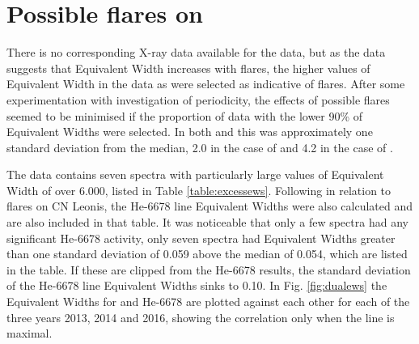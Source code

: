\section{Possible flares on {\harps}}
\protect\label{section:harpsflares}

There is no corresponding X-ray data available for the {\harps} data, but as the {\uves} data suggests that {\ha}
Equivalent Width increases with flares, the higher values of Equivalent Width in the {\harps} data as were selected as
indicative of flares. After some experimentation with investigation of periodicity, the effects of possible flares seemed to be
minimised if the proportion of data with the lower 90\% of Equivalent Widths were selected. In both {\uves} and {\harps}
this was approximately one standard deviation from the median, 2.0 in the case of {\uves} and 4.2 in the case of
{\harps}.

The {\harps} data contains seven spectra with particularly large values of Equivalent Width of over 6.000, listed in
Table \ref{table:excessews}.  Following \citet[fig. 8]{fuhrmeister08} in relation to flares on CN Leonis, the He-6678
line Equivalent Widths were also calculated and are also included in that table. It was noticeable that only a few
spectra had any significant He-6678 activity, only seven spectra had Equivalent Widths greater than one standard
deviation of 0.059 above the median of 0.054, which are listed in the table. If these are clipped from the He-6678
results, the standard deviation of the He-6678 line Equivalent Widths sinks to 0.10. In Fig. \ref{fig:dualews} the
Equivalent Widths for {\ha} and He-6678 are plotted against each other for each of the three years 2013, 2014 and
2016, showing the correlation only when the {\ha} line is maximal.

